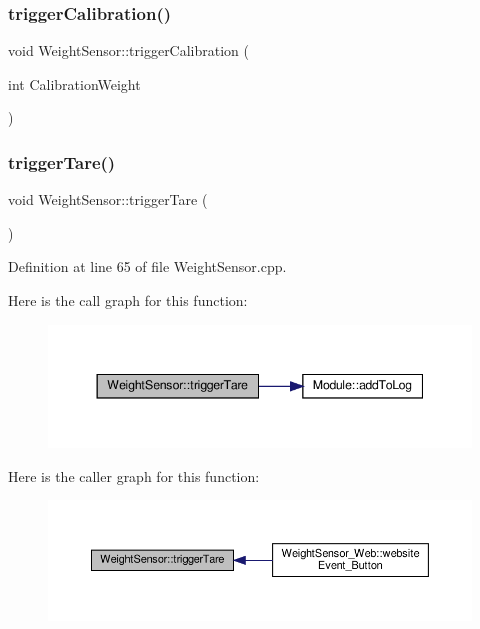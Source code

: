 \subsubsection{\texorpdfstring{trigger\+Calibration()}{triggerCalibration()}\hspace{0.1cm}{\footnotesize\ttfamily [2/2]}}
{\footnotesize\ttfamily void Weight\+Sensor\+::trigger\+Calibration (\begin{DoxyParamCaption}\item[{int}]{Calibration\+Weight }\end{DoxyParamCaption})}

\mbox{\label{class_weight_sensor_a54b241f48e63ef6b17eade0d55a78008}} 
\subsubsection{\texorpdfstring{trigger\+Tare()}{triggerTare()}\hspace{0.1cm}{\footnotesize\ttfamily [1/2]}}
{\footnotesize\ttfamily void Weight\+Sensor\+::trigger\+Tare (\begin{DoxyParamCaption}{ }\end{DoxyParamCaption})}



Definition at line 65 of file Weight\+Sensor.\+cpp.

Here is the call graph for this function\+:
\nopagebreak
\begin{figure}[H]
\begin{center}
\leavevmode
\includegraphics[width=344pt]{class_weight_sensor_a54b241f48e63ef6b17eade0d55a78008_cgraph}
\end{center}
\end{figure}
Here is the caller graph for this function\+:
\nopagebreak
\begin{figure}[H]
\begin{center}
\leavevmode
\includegraphics[width=350pt]{class_weight_sensor_a54b241f48e63ef6b17eade0d55a78008_icgraph}
\end{center}
\end{figure}
\mbox{\label{class_weight_sensor_a54b241f48e63ef6b17eade0d55a78008}} 
